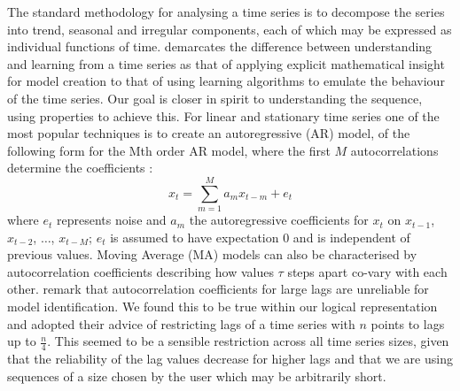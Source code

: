 The standard methodology for analysing a time series is to decompose
the series into trend, seasonal and irregular components, each of
which may be expressed as individual functions of time. \cite{wg94}
demarcates the difference between understanding and learning from a
time series as that of applying explicit mathematical insight for
model creation to that of using
learning algorithms to emulate the behaviour of the time series. Our
goal is closer in spirit to understanding the sequence, using
properties to achieve this. For linear and stationary time series one
of the most popular techniques is to create an autoregressive (AR) model,
of the following form for the Mth order AR model, where the first $M$
autocorrelations determine the coefficients \cite{end95}:
\begin{displaymath}
x_t = \sum_{m=1}^M a_m x_{t-m} + e_t
\end{displaymath}
where $e_t$ represents noise and $a_m$ the autoregressive
coefficients for $x_t$ on $x_{t-1}$, $x_{t-2}$, $\ldots$, $x_{t-M}$; $e_t$
is assumed to have expectation 0 and is independent of previous
values. Moving Average (MA) models can also be characterised by
autocorrelation coefficients describing how values $\tau$ steps apart
co-vary with each other. \cite{ko90} remark that autocorrelation
coefficients for large lags are unreliable for model
identification. We found this to be true within our logical
representation and adopted their advice of restricting lags of a time
series with $n$ points to lags up to $\frac{n}{4}$. This seemed to be
a sensible 
restriction across all time series sizes, given that the reliability
of the lag values decrease for higher lags and that we are using
sequences of a size chosen by the user which may be arbitrarily short.

\medskip

